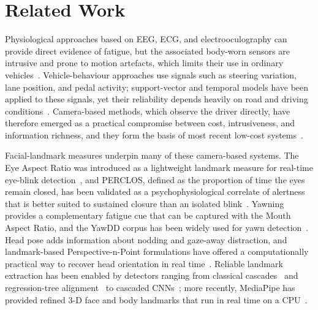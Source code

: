 \documentclass[conference]{IEEEtran}
\begin{document}
\section{Related Work}
Physiological approaches based on EEG, ECG, and electrooculography can provide direct evidence of fatigue, but the associated body-worn sensors are intrusive and prone to motion artefacts, which limits their use in ordinary vehicles~\cite{ji2004}. Vehicle-behaviour approaches use signals such as steering variation, lane position, and pedal activity; support-vector and temporal models have been applied to these signals, yet their reliability depends heavily on road and driving conditions~\cite{baccour,mcdonald}. Camera-based methods, which observe the driver directly, have therefore emerged as a practical compromise between cost, intrusiveness, and information richness, and they form the basis of most recent low-cost systems~\cite{elnabi,bergasa}.

Facial-landmark measures underpin many of these camera-based systems. The Eye Aspect Ratio was introduced as a lightweight landmark measure for real-time eye-blink detection~\cite{soukopova}, and PERCLOS, defined as the proportion of time the eyes remain closed, has been validated as a psychophysiological correlate of alertness that is better suited to sustained closure than an isolated blink~\cite{wierwille,dinges}. Yawning provides a complementary fatigue cue that can be captured with the Mouth Aspect Ratio, and the YawDD corpus has been widely used for yawn detection~\cite{abtahi}. Head pose adds information about nodding and gaze-away distraction, and landmark-based Perspective-n-Point formulations have offered a computationally practical way to recover head orientation in real time~\cite{kim,lepetit}. Reliable landmark extraction has been enabled by detectors ranging from classical cascades~\cite{viola} and regression-tree alignment~\cite{king,kazemi} to cascaded CNNs~\cite{zhang_mtcnn}; more recently, MediaPipe has provided refined 3-D face and body landmarks that run in real time on a CPU~\cite{lugaresi,bazarevsky}.
\end{document}
